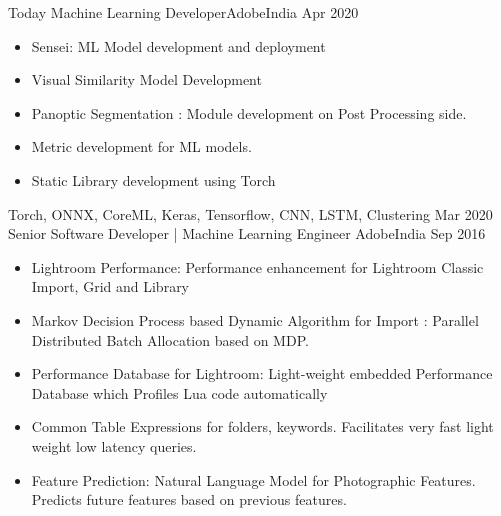 %
%
%

\begin{experiences}
  \experience
    {Today}   {Machine Learning Developer}{Adobe}{India}
    {Apr 2020} {
                      \begin{itemize}
                        \item Sensei: ML Model development and deployment
                        \item Visual Similarity Model Development 
                        \item Panoptic Segmentation : Module development on Post Processing side.
                        \item Metric development for ML models.
                        \item Static Library development using Torch
                      \end{itemize}
                    }
                    {Torch, ONNX, CoreML, Keras, Tensorflow, CNN, LSTM, Clustering}
  \emptySeparator
  \experience 
  {Mar 2020}
  {Senior Software Developer | Machine Learning Engineer}
  {Adobe}{India}
  {Sep 2016}
  {
  	\begin{itemize}
  	
  	\item Lightroom Performance: Performance enhancement for Lightroom Classic Import, Grid and Library
  	
  	\item Markov Decision Process based Dynamic Algorithm for Import : Parallel Distributed Batch Allocation based on MDP.                     
  	
  	\item Performance Database for Lightroom: Light-weight embedded Performance Database which Profiles Lua code automatically   
  	
  	\item Common Table Expressions for folders, keywords. Facilitates very fast light weight low latency queries.                
  	
  	\item Feature Prediction: Natural Language Model for Photographic Features. Predicts future features based on previous features.
  	

\end{itemize}}
\end{experiences}
